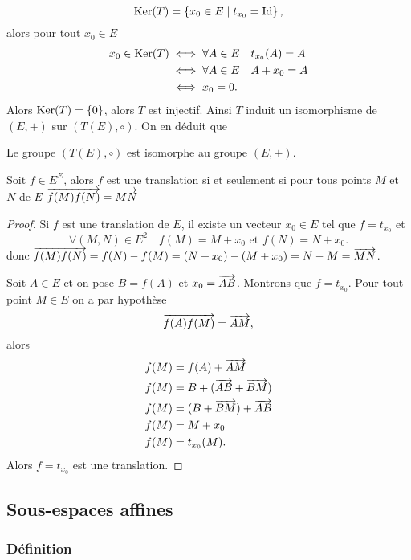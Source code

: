 \begin{equation}
  \operatorname{Ker}(T)= \left\{x_0 \in E\mathrel{}\middle|\mathrel{}t_{x_0} = \operatorname{Id}\right\},
\end{equation}
alors pour tout $x_0 \in E$
\begin{align}
  x_0 \in \operatorname{Ker}(T) &\iff \forall A \in E \quad t_{x_0}(A)=A\\
  &\iff \forall A \in E \quad A+x_0=A \\
  &\iff x_0=0.
\end{align}
Alors $\operatorname{Ker}(T)=\{0\}$, alors $T$ est injectif. Ainsi $T$ induit un isomorphisme de $(E,+)$ sur $(T(E),\circ)$. On en déduit que
\begin{prop}
  Le groupe $(T(E),\circ)$ est isomorphe au groupe $(E,+)$.
\end{prop}
%
\begin{theo}
  Soit $f \in E^E$, alors $f$ est une translation si et seulement si pour tous points $M$ et $N$ de $E$ $\overrightarrow{f(M)f(N)}=\overrightarrow{MN}$
\end{theo}
\begin{proof}
  Si $f$ est une translation de $E$, il existe un vecteur $x_0 \in E$ tel que $f=t_{x_0}$ et
  \begin{equation}
    \forall (M, N) \in E^2 \quad f(M)=M+x_0 \text{~et~} f(N)=N+x_0.
  \end{equation}
  donc $\overrightarrow{f(M)f(N)}=f(N)-f(M)=(N+x_0)-(M+x_0)=N-M=\overrightarrow{MN}$.

  Soit $A \in E$ et on pose $B=f(A)$ et $x_0=\overrightarrow{AB}$. Montrons que $f=t_{x_0}$. Pour tout point $M \in E$ on a par hypothèse
  \begin{equation}
    \overrightarrow{f(A)f(M)}=\overrightarrow{AM},
  \end{equation}
  alors
  \begin{align}
   f(M)&=f(A)+\overrightarrow{AM} \\
   f(M)&=B+(\overrightarrow{AB}+\overrightarrow{BM}) \\
   f(M)&=(B+\overrightarrow{BM})+\overrightarrow{AB} \\
   f(M)&=M+x_0\\
   f(M)&=t_{x_0}(M).
  \end{align}
  Alors $f=t_{x_0}$ est une translation.
\end{proof}

\subsection{Sous-espaces affines}

\subsubsection{Définition}

